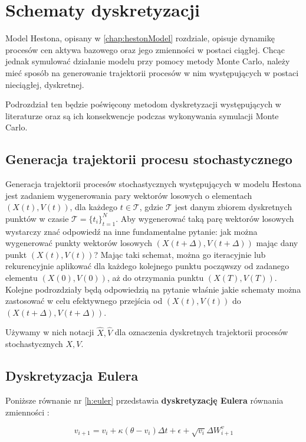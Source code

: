 \documentclass{pracamgr}
\begin{document}
\section{Schematy dyskretyzacji}


Model Hestona, opisany w \ref{chap:hestonModel} rozdziale, opisuje dynamikę procesów cen aktywa 
bazowego oraz jego zmienności w postaci ciągłej.
Chcąc jednak symulować działanie modelu przy pomocy metody Monte Carlo, należy mieć sposób na 
generowanie trajektorii procesów w nim występujących w postaci nieciągłej, dyskretnej. 

Podrozdział ten będzie poświęcony metodom dyskretyzacji występujących w literaturze oraz są ich 
konsekwencje podczas wykonywania symulacji Monte Carlo.


\subsection{Generacja trajektorii procesu stochastycznego}
Generacja trajektorii procesów stochastycznych występujących w modelu Hestona jest zadaniem 
wygenerowania pary wektorów losowych o elementach $(X(t), V(t))$, dla każdego $t \in \mathscr{T}$, 
gdzie $\mathscr{T}$ jest danym zbiorem dyskretnych punktów w czasie 
$\mathscr{T}  = \{t_i\}^N_{t=1}$. Aby wygenerować taką parę wektorów losowych wystarczy znać 
odpowiedź na inne fundamentalne pytanie: jak można wygenerować punkty wektorów losowych 
$(X(t+ \Delta), V(t+ \Delta))$
mając dany punkt $(X(t), V(t))$? Mając taki schemat, można go iteracyjnie lub rekurencyjnie aplikować 
dla każdego kolejnego punktu począwszy od zadanego elementu $(X(0), V(0))$, 
aż do otrzymania punktu $(X(T), V(T))$.
Kolejne podrozdziały będą odpowiedzią na pytanie właśnie jakie schematy można zastosować w celu 
efektywnego przejścia od $(X(t), V(t))$ do $(X(t+ \Delta), V(t+ \Delta))$.

Używamy w nich notacji $\hat{X}, \hat{V}$ dla oznaczenia dyskretnych trajektorii procesów 
stochastycznych $X, V$.

\subsection{Dyskretyzacja Eulera}

Poniższe równanie nr \ref{h:euler} przedstawia \textbf{dyskretyzację Eulera} równania 
zmienności \cite{Broadie}:
 
\begin{equation}\label{h:euler}
v_{i+1}  = v_i + \kappa (\theta - v_i) \Delta t + \epsilon +  \sqrt{v_i} \Delta W^{v}_{i+1}
\end{equation}
\end{document}
